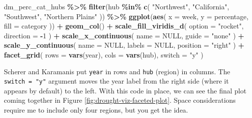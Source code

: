 \documentclass[
]{book}
\newenvironment{Shaded}{\begin{snugshade}}{\end{snugshade}}
\newcommand{\AttributeTok}[1]{\textcolor[rgb]{0.13,0.29,0.53}{#1}}
\newcommand{\ConstantTok}[1]{\textcolor[rgb]{0.56,0.35,0.01}{#1}}
\newcommand{\DecValTok}[1]{\textcolor[rgb]{0.00,0.00,0.81}{#1}}
\newcommand{\FunctionTok}[1]{\textcolor[rgb]{0.13,0.29,0.53}{\textbf{#1}}}
\newcommand{\NormalTok}[1]{#1}
\newcommand{\SpecialCharTok}[1]{\textcolor[rgb]{0.81,0.36,0.00}{\textbf{#1}}}
\newcommand{\StringTok}[1]{\textcolor[rgb]{0.31,0.60,0.02}{#1}}
\begin{document}
\begin{Shaded}
\begin{Highlighting}[]
\NormalTok{dm\_perc\_cat\_hubs }\SpecialCharTok{\%\textgreater{}\%}
  \FunctionTok{filter}\NormalTok{(hub }\SpecialCharTok{\%in\%} \FunctionTok{c}\NormalTok{(}
    \StringTok{"Northwest"}\NormalTok{,}
    \StringTok{"California"}\NormalTok{,}
    \StringTok{"Southwest"}\NormalTok{,}
    \StringTok{"Northern Plains"}
\NormalTok{  )) }\SpecialCharTok{\%\textgreater{}\%}
  \FunctionTok{ggplot}\NormalTok{(}\FunctionTok{aes}\NormalTok{(}
    \AttributeTok{x =}\NormalTok{ week,}
    \AttributeTok{y =}\NormalTok{ percentage,}
    \AttributeTok{fill =}\NormalTok{ category}
\NormalTok{  )) }\SpecialCharTok{+}
  \FunctionTok{geom\_col}\NormalTok{() }\SpecialCharTok{+}
  \FunctionTok{scale\_fill\_viridis\_d}\NormalTok{(}
    \AttributeTok{option =} \StringTok{"rocket"}\NormalTok{,}
    \AttributeTok{direction =} \SpecialCharTok{{-}}\DecValTok{1}
\NormalTok{  ) }\SpecialCharTok{+}
  \FunctionTok{scale\_x\_continuous}\NormalTok{(}
    \AttributeTok{name =} \ConstantTok{NULL}\NormalTok{,}
    \AttributeTok{guide =} \StringTok{"none"}
\NormalTok{  ) }\SpecialCharTok{+}
  \FunctionTok{scale\_y\_continuous}\NormalTok{(}
    \AttributeTok{name =} \ConstantTok{NULL}\NormalTok{,}
    \AttributeTok{labels =} \ConstantTok{NULL}\NormalTok{,}
    \AttributeTok{position =} \StringTok{"right"}
\NormalTok{  ) }\SpecialCharTok{+}
  \FunctionTok{facet\_grid}\NormalTok{(}
    \AttributeTok{rows =} \FunctionTok{vars}\NormalTok{(year),}
    \AttributeTok{cols =} \FunctionTok{vars}\NormalTok{(hub),}
    \AttributeTok{switch =} \StringTok{"y"}
\NormalTok{  )}
\end{Highlighting}
\end{Shaded}

Scherer and Karamanis put \texttt{year} in rows and \texttt{hub} (region) in columns. The \texttt{switch\ =\ "y"} argument moves the year label from the right side (where it appears by default) to the left. With this code in place, we can see the final plot coming together in Figure \ref{fig:drought-viz-faceted-plot}. Space considerations require me to include only four regions, but you get the idea.
\end{document}
